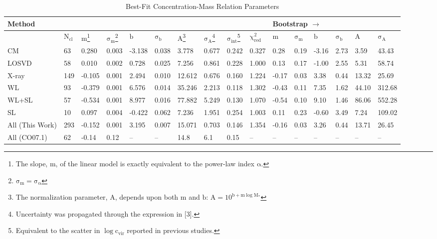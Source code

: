 \begin{landscape}
\begin{table}
\begin{minipage}{210mm}
\caption{Best-Fit Concentration-Mass Relation Parameters}
\label{tab2}
\begin{tabular}{@{}llllllllllllllll}
\hline
\hline
 Method & & & & & & & & & & \multicolumn{3}{l}{Bootstrap $\rightarrow$}& & & \\ 
\hline
 &$\mathrm{N_{cl}}$&$\mathrm{m}$\footnote[1]{The slope, $\mathrm{m}$, of the
 linear model is exactly equivalent to the power-law index
 $\mathrm{\alpha}$.}&$\mathrm{\sigma_{m}}$\footnote[2]{$\mathrm{\sigma_{m} =
                      \sigma_{\alpha}}$} &$\mathrm{b}$ 
                &$\mathrm{\sigma_{b}}$ &$\mathrm{A}$\footnote[3]{The
                                         normalization parameter, $\mathrm{A}$,
                                         depends upon both $\mathrm{m}$ and $\mathrm{b}$:
                                         $\mathrm{A=10^{b+m\log M_{*}}}$}
                    &$\mathrm{\sigma_{A}}$\footnote[4]{Uncertainty was
                      propagated through the expression in [3].}
                    &$\mathrm{\sigma_{int}}$\footnote[5]{Equivalent to the
                      scatter in $\mathrm{\log c_{vir}}$ reported in previous studies.}& $\mathrm{\chi^{2}_{red}}$& $\mathrm{m}$ &$\mathrm{\sigma_{m}}$ &$\mathrm{b}$
                            &$\mathrm{\sigma_{b}}$ &$\mathrm{A}$
                                                          &$\mathrm{\sigma_{A}}$\\
\hline
CM & 63 & 0.280 & 0.003 & -3.138 & 0.038 & 3.778 & 0.677 & 0.242 & 0.327 & 0.28& 0.19& -3.16&2.73 & 3.59&43.43\\
LOSVD & 58 & 0.010 & 0.002 & 0.728& 0.025 & 7.256 & 0.861 & 0.228 & 1.000 & 0.13& 0.17& -1.00& 2.55& 5.31&58.74\\
X-ray & 149 & -0.105 & 0.001 & 2.494 & 0.010 & 12.612 & 0.676 & 0.160 & 1.224 &-0.17 & 0.03& 3.38& 0.44& 13.32&25.69\\
WL & 93 & -0.379 & 0.001 & 6.576 & 0.014 & 35.246 & 2.213& 0.118 & 1.302 & -0.43& 0.11& 7.35& 1.62& 44.10&312.68\\
WL+SL & 57 & -0.534 & 0.001 & 8.977& 0.016 & 77.882 & 5.249 & 0.130 & 1.070 & -0.54& 0.10& 9.10& 1.46& 86.06&552.28\\
SL & 10 & 0.097 & 0.004 & -0.422 & 0.062 & 7.236 & 1.951 & 0.254 & 1.003 & 0.11& 0.23& -0.60& 3.49& 7.24&109.02\\
\hline
All (This Work) & 293 & -0.152 & 0.001 & 3.195 & 0.007 & 15.071 & 0.703 & 0.146 & 1.354 & -0.16& 0.03& 3.26& 0.44& 13.71&26.45\\
All (CO07.1)& 62 & -0.14 & 0.12 & -- & -- & 14.8 & 6.1 & 0.15 & -- & -- & -- & -- & -- & -- & --\\
\hline
\hline
\end{tabular}
\end{minipage}
\end{table}
\end{landscape}

